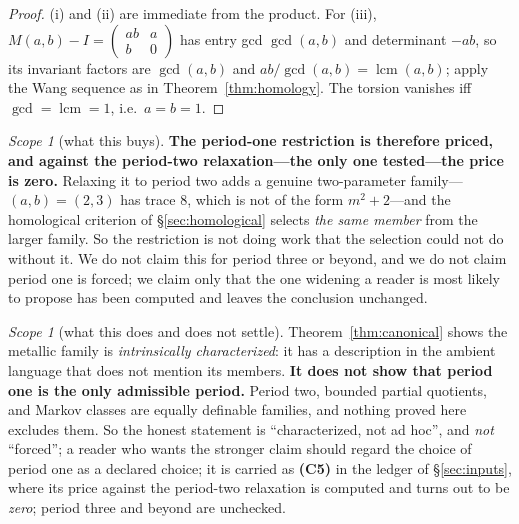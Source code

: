 \documentclass[11pt,reqno]{amsart}
\theoremstyle{plain}
\theoremstyle{definition}
\theoremstyle{remark}
\newtheorem{scope}[theorem]{Scope}
\begin{document}
\begin{proof}
(i) and (ii) are immediate from the product. For (iii),
$M(a,b)-I=\left(\begin{smallmatrix}ab&a\\b&0\end{smallmatrix}\right)$ has entry gcd
$\gcd(a,b)$ and determinant $-ab$, so its invariant factors are $\gcd(a,b)$ and
$ab/\gcd(a,b)=\operatorname{lcm}(a,b)$; apply the Wang sequence as in
Theorem~\ref{thm:homology}. The torsion vanishes iff $\gcd=\operatorname{lcm}=1$, i.e.\
$a=b=1$.
\end{proof}

\begin{scope}[what this buys]\label{sc:pricedperiod}
\textbf{The period-one restriction is therefore priced, and against the period-two
relaxation---the only one tested---the price is zero.} Relaxing
it to period two adds a genuine two-parameter family---$(a,b)=(2,3)$ has trace $8$,
which is not of the form $m^2+2$---and the homological criterion of
\S\ref{sec:homological} selects \emph{the same member} from the larger family. So the
restriction is not doing work that the selection could not do without it. We do not
claim this for period three or beyond, and we do not claim period one is forced; we
claim only that the one widening a reader is most likely to propose has been computed
and leaves the conclusion unchanged.
\end{scope}

\begin{scope}[what this does and does not settle]\label{sc:notunchosen}
Theorem~\ref{thm:canonical} shows the metallic family is \emph{intrinsically
characterized}: it has a description in the ambient language that does not mention its
members. \textbf{It does not show that period one is the only admissible period.}
Period two, bounded partial quotients, and Markov classes are equally definable
families, and nothing proved here excludes them. So the honest statement is
``characterized, not ad hoc'', and \emph{not} ``forced''; a reader who wants the
stronger claim should regard the choice of period one as a declared choice; it is
carried as \textbf{(C5)} in the ledger of \S\ref{sec:inputs}, where its price against the period-two
relaxation is computed and turns out to be \emph{zero}; period three and beyond are
unchecked.
\end{scope}
\end{document}
